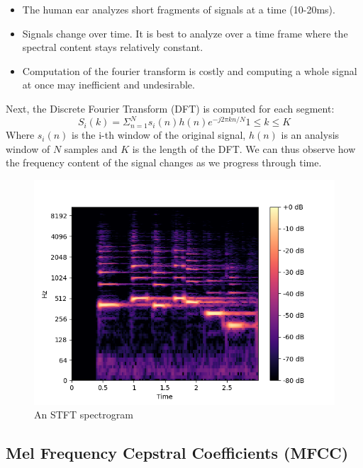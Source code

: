 \documentclass[a4paper, 12pt, twoside]{report}
\begin{document}
\begin{itemize}
\item The human ear analyzes short fragments of signals at a time (10-20ms).
\item Signals change over time. It is best to analyze over a time frame where the spectral content stays relatively constant.
\item Computation of the fourier transform is costly and computing a whole signal at once may inefficient and undesirable.
\end{itemize}

Next, the Discrete Fourier Transform (DFT) is computed for each segment:
\begin{equation}
\label{eq:2}
S_{i}(k) = \Sigma^{N}_{n=1}s_{i}(n)h(n)e^{-j2\pi kn/N} 1\leq k \leq K
\end{equation}
Where $s_{i}(n)$ is the i-th window of the original signal, $h(n)$ is an analysis window of $N$ samples and $K$ is the length of the DFT.
We can thus observe how the frequency content of the signal changes as we progress through time.

\begin{figure}[H]
\centering
\includegraphics[width=\textwidth]{./Figures/orig_stft.png}
\caption{An STFT spectrogram}
\end{figure}

\subsection{Mel Frequency Cepstral Coefficients (MFCC)}
\label{sec:org657745a}
\end{document}
